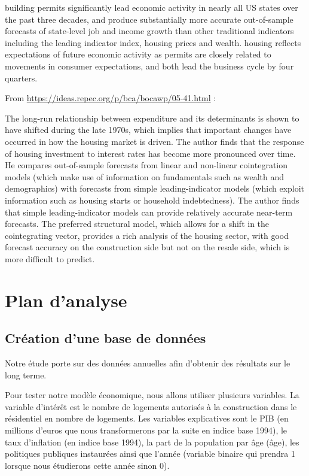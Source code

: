 \documentclass[11pt,]{article}
\begin{document}
building permits significantly lead economic activity in nearly all US
states over the past three decades, and produce substantially more
accurate out-of-sample forecasts of state-level job and income growth
than other traditional indicators including the leading indicator index,
housing prices and wealth. housing reflects expectations of future
economic activity as permits are closely related to movements in
consumer expectations, and both lead the business cycle by four
quarters.

From \url{https://ideas.repec.org/p/bca/bocawp/05-41.html} :

The long-run relationship between expenditure and its determinants is
shown to have shifted during the late 1970s, which implies that
important changes have occurred in how the housing market is driven. The
author finds that the response of housing investment to interest rates
has become more pronounced over time. He compares out-of-sample
forecasts from linear and non-linear cointegration models (which make
use of information on fundamentals such as wealth and demographics) with
forecasts from simple leading-indicator models (which exploit
information such as housing starts or household indebtedness). The
author finds that simple leading-indicator models can provide relatively
accurate near-term forecasts. The preferred structural model, which
allows for a shift in the cointegrating vector, provides a rich analysis
of the housing sector, with good forecast accuracy on the construction
side but not on the resale side, which is more difficult to predict.

\hypertarget{plan-danalyse}{%
\section{Plan d'analyse}\label{plan-danalyse}}

\hypertarget{creation-dune-base-de-donnees}{%
\subsection{Création d'une base de
données}\label{creation-dune-base-de-donnees}}

Notre étude porte sur des données annuelles afin d'obtenir des résultats
sur le long terme.

Pour tester notre modèle économique, nous allons utiliser plusieurs
variables. La variable d'intérêt est le nombre de logements autorisés à
la construction dans le résidentiel en nombre de logements. Les
variables explicatives sont le PIB (en millions d'euros que nous
transformerons par la suite en indice base 1994), le taux d'inflation
(en indice base 1994), la part de la population par âge (âge), les
politiques publiques instaurées ainsi que l'année (variable binaire qui
prendra 1 lorsque nous étudierons cette année sinon 0).
\end{document}
